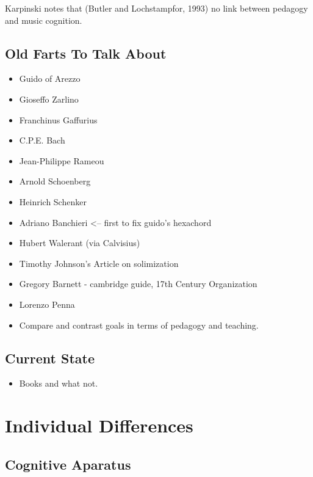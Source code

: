 \documentclass[]{book}
\providecommand{\tightlist}{%
  \setlength{\itemsep}{0pt}\setlength{\parskip}{0pt}}
\theoremstyle{definition}
\theoremstyle{definition}
\theoremstyle{definition}
\theoremstyle{remark}
\begin{document}
Karpinski notes that (Butler and Lochstampfor, 1993) no link between
pedagogy and music cognition.

\hypertarget{old-farts-to-talk-about}{%
\section{Old Farts To Talk About}\label{old-farts-to-talk-about}}

\begin{itemize}
\item
  Guido of Arezzo
\item
  Gioseffo Zarlino
\item
  Franchinus Gaffurius
\item
  C.P.E. Bach
\item
  Jean-Philippe Rameou
\item
  Arnold Schoenberg
\item
  Heinrich Schenker
\item
  Adriano Banchieri \textless{}-- first to fix guido's hexachord
\item
  Hubert Walerant (via Calvisius)
\item
  Timothy Johnson's Article on solimization
\item
  Gregory Barnett - cambridge guide, 17th Century Organization
\item
  Lorenzo Penna
\item
  Compare and contrast goals in terms of pedagogy and teaching.
\end{itemize}

\hypertarget{current-state}{%
\section{Current State}\label{current-state}}

\begin{itemize}
\tightlist
\item
  Books and what not.
\end{itemize}

\hypertarget{individual-differences}{%
\chapter{Individual Differences}\label{individual-differences}}

\hypertarget{cognitive-aparatus}{%
\section{Cognitive Aparatus}\label{cognitive-aparatus}}
\end{document}
